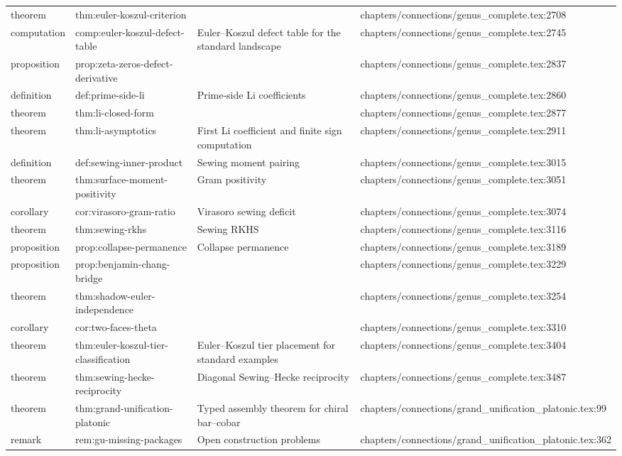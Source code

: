 \documentclass[11pt]{article}
\begin{document}
\begin{longtable}{L{0.10\textwidth}L{0.26\textwidth}L{0.42\textwidth}L{0.22\textwidth}}
theorem & thm:euler-koszul-criterion &  & chapters/connections/genus\_complete.tex:2708\\
computation & comp:euler-koszul-defect-table & Euler--Koszul defect table for the standard landscape & chapters/connections/genus\_complete.tex:2745\\
proposition & prop:zeta-zeros-defect-derivative &  & chapters/connections/genus\_complete.tex:2837\\
definition & def:prime-side-li & Prime-side Li coefficients & chapters/connections/genus\_complete.tex:2860\\
theorem & thm:li-closed-form &  & chapters/connections/genus\_complete.tex:2877\\
theorem & thm:li-asymptotics & First Li coefficient and finite sign computation & chapters/connections/genus\_complete.tex:2911\\
definition & def:sewing-inner-product & Sewing moment pairing & chapters/connections/genus\_complete.tex:3015\\
theorem & thm:surface-moment-positivity & Gram positivity & chapters/connections/genus\_complete.tex:3051\\
corollary & cor:virasoro-gram-ratio & Virasoro sewing deficit & chapters/connections/genus\_complete.tex:3074\\
theorem & thm:sewing-rkhs & Sewing RKHS & chapters/connections/genus\_complete.tex:3116\\
proposition & prop:collapse-permanence & Collapse permanence & chapters/connections/genus\_complete.tex:3189\\
proposition & prop:benjamin-chang-bridge &  & chapters/connections/genus\_complete.tex:3229\\
theorem & thm:shadow-euler-independence &  & chapters/connections/genus\_complete.tex:3254\\
corollary & cor:two-faces-theta &  & chapters/connections/genus\_complete.tex:3310\\
theorem & thm:euler-koszul-tier-classification & Euler--Koszul tier placement for standard examples & chapters/connections/genus\_complete.tex:3404\\
theorem & thm:sewing-hecke-reciprocity & Diagonal Sewing--Hecke reciprocity & chapters/connections/genus\_complete.tex:3487\\
theorem & thm:grand-unification-platonic & Typed assembly theorem for chiral bar--cobar & chapters/connections/grand\_unification\_platonic.tex:99\\
remark & rem:gu-missing-packages & Op{}en construction problems & chapters/connections/grand\_unification\_platonic.tex:362\\

\end{longtable}
\end{document}
